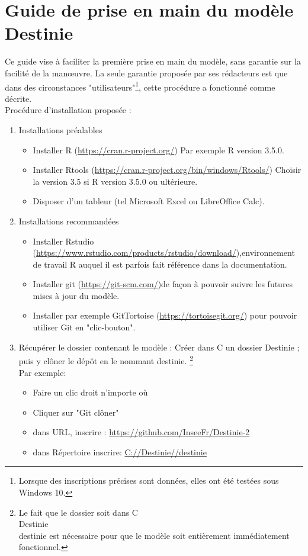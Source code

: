 \section{Guide de prise en main du modèle Destinie}

Ce guide vise à faciliter la première prise en main du modèle, sans garantie sur la facilité de la manœuvre. La seule garantie proposée par ses rédacteurs est que dans des circonstances "utilisateurs"\footnote{Lorsque des inscriptions précises sont données, elles ont été testées sous Windows 10.}, cette procédure a fonctionné comme décrite.\\

Procédure d'installation proposée :\\
\begin{enumerate}

\item Installations préalables 
\begin{itemize}
\item Installer	R (\url{https://cran.r-project.org/}) Par exemple R version 3.5.0.
\item Installer	Rtools (\url{https://cran.r-project.org/bin/windows/Rtools/}) Choisir la version 3.5 si R version 3.5.0 ou ultérieure.
\item Disposer d'un tableur (tel Microsoft Excel ou LibreOffice Calc).
\end{itemize}




\item Installations recommandées 
\begin{itemize}
\item Installer	Rstudio (\url{https://www.rstudio.com/products/rstudio/download/}),environnement de travail R auquel il est parfois fait référence dans la documentation.
\item Installer git (\url{https://git-scm.com/})de façon à pouvoir suivre les futures mises à jour du modèle.
\item Installer par exemple GitTortoise (\url{https://tortoisegit.org/}) pour pouvoir utiliser Git en "clic-bouton".
\end{itemize}

\item Récupérer le dossier contenant le modèle : 
Créer dans C  un dossier Destinie ; puis y clôner le dépôt en le nommant destinie. \footnote{Le fait que le dossier soit dans C\\Destinie\\destinie est nécessaire pour que le modèle soit entièrement immédiatement fonctionnel.} \\
Par exemple:
\begin{itemize}
\item Faire un clic droit n’importe où
\item Cliquer sur "Git clôner"
\item  dans URL, inscrire : \url{https://github.com/InseeFr/Destinie-2}
\item dans Répertoire inscrire: \url{C://Destinie//destinie}
\end{itemize}


\end{enumerate}
